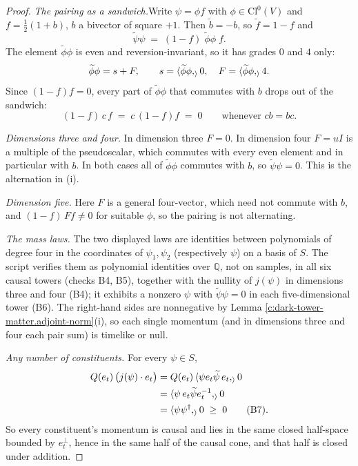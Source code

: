 \documentclass[11pt]{article}
\theoremstyle{definition}
\theoremstyle{plain}
\providecommand{\Cl}{}\renewcommand{\Cl}{\mathrm{Cl}}
\providecommand{\ip}{}\renewcommand{\ip}[2]{\langle #1, #2\rangle}
\providecommand{\rev}{}\renewcommand{\rev}[1]{\widetilde{#1}}
\begin{document}
\begin{proof}
\textit{The pairing as a sandwich.}\enspace Write $\psi = \phi f$ with $\phi \in \Cl^{0}(V)$ and $f = \tfrac{1}{2}(1 + b)$, $b$ a bivector of square $+1$. Then $\rev{b} = -b$, so $\rev{f} = 1 - f$ and
\[
\rev{\psi}\psi \;=\; (1 - f)\;\rev{\phi}\phi\;f.
\]
The element $\rev{\phi}\phi$ is even and reversion-invariant, so it has grades $0$ and $4$ only:
\[
\rev{\phi}\phi = s + F, \qquad s = \ip{\rev{\phi}\phi}_{0}, \quad F = \ip{\rev{\phi}\phi}_{4}.
\]
Since $(1 - f)f = 0$, every part of $\rev{\phi}\phi$ that commutes with $b$ drops out of the sandwich:
\[
(1 - f)\,c\,f \;=\; c\,(1 - f)f \;=\; 0 \qquad \text{whenever } cb = bc.
\]



\emph{Dimensions three and four.}  In dimension three $F = 0$. In dimension four $F = uI$ is a multiple of the pseudoscalar, which commutes with every even element and in particular with $b$. In both cases all of $\rev{\phi}\phi$ commutes with $b$, so $\rev{\psi}\psi = 0$. This is the alternation in (i).



\emph{Dimension five.}  Here $F$ is a general four-vector, which need not commute with $b$, and $(1 - f)\,F f \neq 0$ for suitable $\phi$, so the pairing is not alternating.



\emph{The mass laws.}  The two displayed laws are identities between polynomials of degree four in the coordinates of $\psi_{1}, \psi_{2}$ (respectively $\psi$) on a basis of $S$. The script verifies them as polynomial identities over $\mathbb{Q}$, not on samples, in all six causal towers (checks B4, B5), together with the nullity of $j(\psi)$ in dimensions three and four (B4); it exhibits a nonzero $\psi$ with $\rev{\psi}\psi = 0$ in each five-dimensional tower (B6). The right-hand sides are nonnegative by Lemma \ref{c:dark-tower-matter.adjoint-norm}(i), so each single momentum (and in dimensions three and four each pair sum) is timelike or null.



\emph{Any number of constituents.}  For every $\psi \in S$,
\begin{align*}
Q(e_{t})\,\bigl(j(\psi)\cdot e_{t}\bigr) &= Q(e_{t})\,\ip{\psi e_{t}\rev{\psi}\,e_{t}}_{0} \\
&= \ip{\psi\,e_{t}\rev{\psi}e_{t}^{-1}}_{0} \\
&= \ip{\psi\psi^{\dagger}}_{0} \;\geq\; 0 \qquad \text{(B7)}.
\end{align*}
So every constituent's momentum is causal and lies in the same closed half-space bounded by $e_{t}^{\perp}$, hence in the same half of the causal cone, and that half is closed under addition.

\end{proof}
\end{document}
